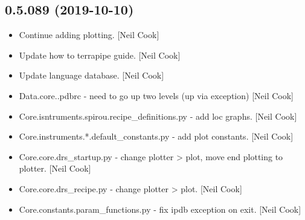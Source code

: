 \documentclass[a4paper,10pt,english]{report}
\begin{document}
\subsection{0.5.089 (2019-10-10)}
\label{\detokenize{misc/changelog:id52}}\begin{itemize}
\item {} 
Continue adding plotting. {[}Neil Cook{]}

\item {} 
Update how to terrapipe guide. {[}Neil Cook{]}

\item {} 
Update language database. {[}Neil Cook{]}

\item {} 
Data.core..pdbrc - need to go up two levels (up via exception) {[}Neil
Cook{]}

\item {} 
Core.isntruments.spirou.recipe\_definitions.py - add loc graphs. {[}Neil
Cook{]}

\item {} 
Core.instruments.*.default\_constants.py - add plot constants. {[}Neil
Cook{]}

\item {} 
Core.core.drs\_startup.py - change plotter \textendash{}\textgreater{} plot, move end plotting
to plotter. {[}Neil Cook{]}

\item {} 
Core.core.drs\_recipe.py - change plotter \textendash{}\textgreater{} plot. {[}Neil Cook{]}

\item {} 
Core.constants.param\_functions.py - fix ipdb exception on exit. {[}Neil
Cook{]}

\end{itemize}
\end{document}
